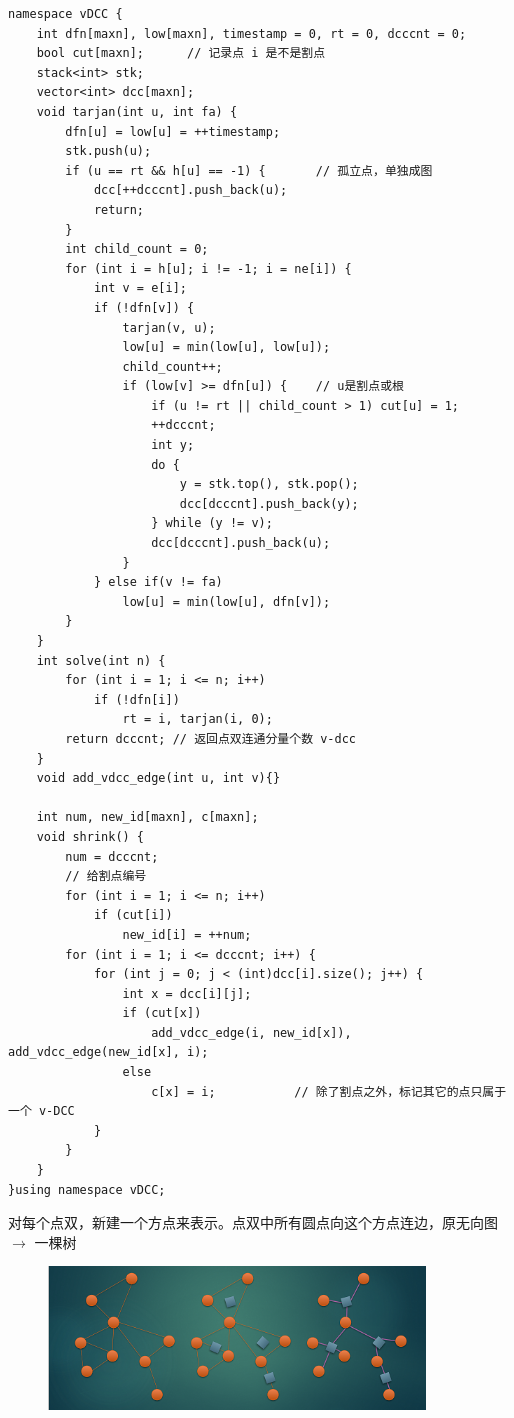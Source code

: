 \begin{verbatim}
namespace vDCC {
    int dfn[maxn], low[maxn], timestamp = 0, rt = 0, dcccnt = 0;
    bool cut[maxn];      // 记录点 i 是不是割点
    stack<int> stk;
    vector<int> dcc[maxn];
    void tarjan(int u, int fa) {
        dfn[u] = low[u] = ++timestamp;
        stk.push(u);
        if (u == rt && h[u] == -1) {       // 孤立点，单独成图 
            dcc[++dcccnt].push_back(u);
            return;
        }
        int child_count = 0;
        for (int i = h[u]; i != -1; i = ne[i]) {
            int v = e[i];
            if (!dfn[v]) {
                tarjan(v, u);
                low[u] = min(low[u], low[u]);
                child_count++;
                if (low[v] >= dfn[u]) {    // u是割点或根 
                    if (u != rt || child_count > 1) cut[u] = 1;
                    ++dcccnt;
                    int y;
                    do {
                        y = stk.top(), stk.pop();
                        dcc[dcccnt].push_back(y);
                    } while (y != v);
                    dcc[dcccnt].push_back(u);
                }
            } else if(v != fa)
                low[u] = min(low[u], dfn[v]);
        }
    }
    int solve(int n) {
        for (int i = 1; i <= n; i++)
            if (!dfn[i])
                rt = i, tarjan(i, 0);
        return dcccnt; // 返回点双连通分量个数 v-dcc
    }
    void add_vdcc_edge(int u, int v){}
    
    int num, new_id[maxn], c[maxn];
    void shrink() {
        num = dcccnt;
        // 给割点编号
        for (int i = 1; i <= n; i++)
            if (cut[i])
                new_id[i] = ++num;
        for (int i = 1; i <= dcccnt; i++) {
            for (int j = 0; j < (int)dcc[i].size(); j++) {
                int x = dcc[i][j];
                if (cut[x])
                    add_vdcc_edge(i, new_id[x]), add_vdcc_edge(new_id[x], i);
                else
                    c[x] = i;           // 除了割点之外，标记其它的点只属于一个 v-DCC
            }
        }
    }
}using namespace vDCC;
\end{verbatim}
\par \noindent 对每个点双，新建一个方点来表示。点双中所有圆点向这个方点连边，原无向图 $\to$ 一棵树
\par \noindent 
\begin{figure}[H]
        \centering
        \par \includegraphics[width=10cm]{images/ecc-tree.png}
\end{figure}

